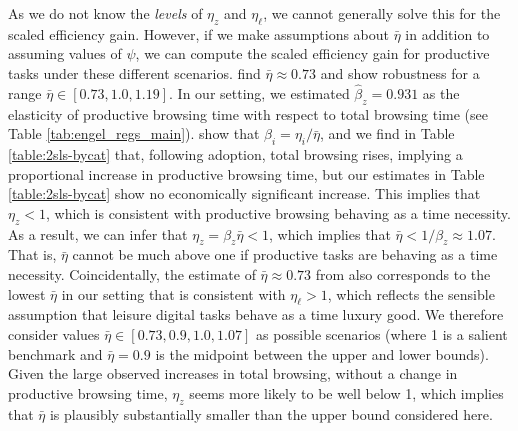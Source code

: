 \documentclass[12pt]{article}
\begin{document}
As we do not know the \textit{levels} of $\eta_z$ and $\eta_{\ell}$, we cannot generally solve this for the scaled efficiency gain. However, if we make assumptions about $\bar{\eta}$ in addition to assuming values of $\psi$, we can compute the scaled efficiency gain for productive tasks under these different scenarios.  \cite{aguiar2021} find $\bar{\eta}\approx 0.73$ and show robustness for a range $\bar{\eta} \in [0.73, 1.0, 1.19]$. In our setting, we estimated $\hat{\beta}_z = 0.931$ as the elasticity of productive browsing time
  with respect to total browsing time (see Table \ref{tab:engel_regs_main}). \cite{aguiar2021} show that  $\beta_i=\eta_i/\bar{\eta}$,  and we find in Table \ref{table:2sls-bycat} that, following adoption, total browsing rises, implying a proportional increase in productive browsing time,  but our estimates in Table \ref{table:2sls-bycat} show no economically significant increase. This implies that $\eta_z < 1$, which is consistent with productive browsing behaving as a time necessity. As a result, we can infer that $\eta_z = \beta_z \bar{\eta} < 1$, which implies that $\bar{\eta} < 1/\beta_z \approx 1.07$.
That is, $\bar{\eta}$ cannot be much above one if productive tasks are behaving as a time necessity. Coincidentally, the estimate of $\bar{\eta}\approx 0.73$ from \cite{aguiar2021} also corresponds to the lowest $\bar{\eta}$ in our setting that is consistent with $\eta_{\ell}>1$, which reflects the sensible assumption that leisure digital tasks behave as a time luxury good.
We therefore consider values $\bar{\eta} \in [0.73, 0.9, 1.0, 1.07]$ as possible scenarios (where 1 is a salient benchmark and $\bar{\eta} = 0.9$ is the midpoint between the upper and lower bounds). Given the large observed increases in total browsing, without a change in productive browsing time, $\eta_z$ seems more likely to be well below 1, which implies that $\bar{\eta}$ is plausibly substantially smaller than the upper bound considered here.
\end{document}
